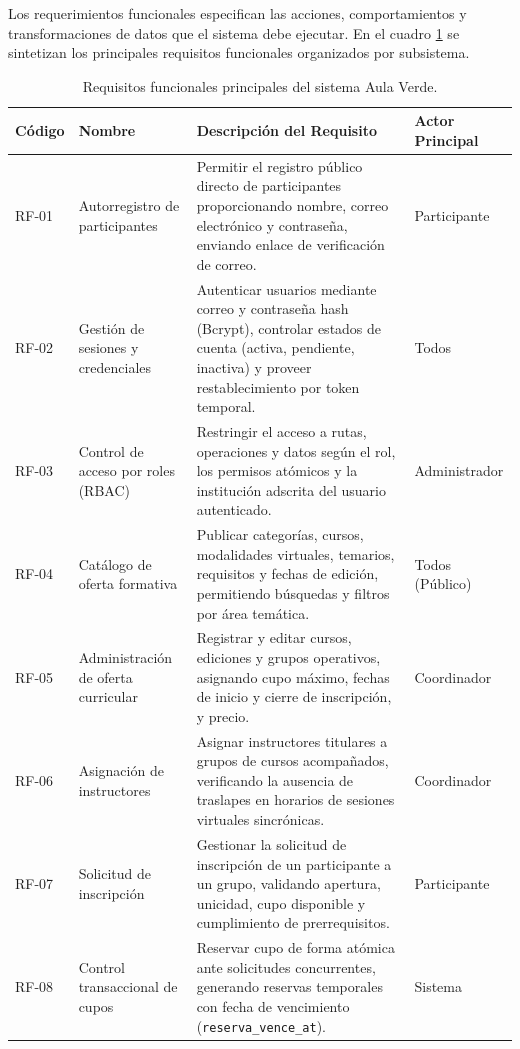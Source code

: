 Los requerimientos funcionales especifican las acciones, comportamientos y transformaciones de datos que el sistema debe ejecutar. En el cuadro \ref{tabla:requisitos_funcionales} se sintetizan los principales requisitos funcionales organizados por subsistema.

\begin{table}[htbp]
\centering
\caption{Requisitos funcionales principales del sistema Aula Verde.}
\label{tabla:requisitos_funcionales}
\small
\begin{tabularx}{\textwidth}{|p{2.0cm}|p{3.8cm}|X|p{2.2cm}|}
\hline
\rowcolor[gray]{0.9}
\textbf{Código} & \textbf{Nombre} & \textbf{Descripción del Requisito} & \textbf{Actor Principal} \\
\hline
RF-01 & Autorregistro de participantes & Permitir el registro público directo de participantes proporcionando nombre, correo electrónico y contraseña, enviando enlace de verificación de correo. & Participante \\
\hline
RF-02 & Gestión de sesiones y credenciales & Autenticar usuarios mediante correo y contraseña hash (Bcrypt), controlar estados de cuenta (activa, pendiente, inactiva) y proveer restablecimiento por token temporal. & Todos \\
\hline
RF-03 & Control de acceso por roles (RBAC) & Restringir el acceso a rutas, operaciones y datos según el rol, los permisos atómicos y la institución adscrita del usuario autenticado. & Administrador \\
\hline
RF-04 & Catálogo de oferta formativa & Publicar categorías, cursos, modalidades virtuales, temarios, requisitos y fechas de edición, permitiendo búsquedas y filtros por área temática. & Todos (Público) \\
\hline
RF-05 & Administración de oferta curricular & Registrar y editar cursos, ediciones y grupos operativos, asignando cupo máximo, fechas de inicio y cierre de inscripción, y precio. & Coordinador \\
\hline
RF-06 & Asignación de instructores & Asignar instructores titulares a grupos de cursos acompañados, verificando la ausencia de traslapes en horarios de sesiones virtuales sincrónicas. & Coordinador \\
\hline
RF-07 & Solicitud de inscripción & Gestionar la solicitud de inscripción de un participante a un grupo, validando apertura, unicidad, cupo disponible y cumplimiento de prerrequisitos. & Participante \\
\hline
RF-08 & Control transaccional de cupos & Reservar cupo de forma atómica ante solicitudes concurrentes, generando reservas temporales con fecha de vencimiento (\texttt{reserva\_vence\_at}). & Sistema \\

\end{tabularx}
\end{table}
